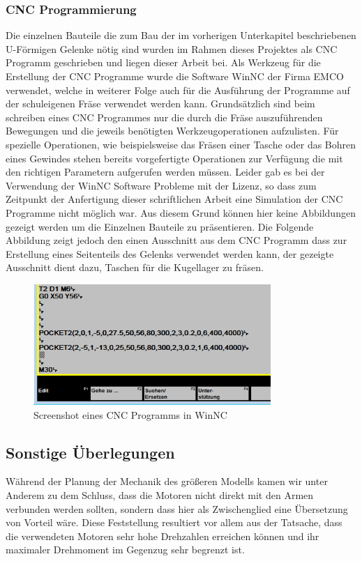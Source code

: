 \subsubsection{CNC Programmierung}
Die einzelnen Bauteile die zum Bau der im vorherigen Unterkapitel beschriebenen U-Förmigen Gelenke nötig sind wurden im Rahmen dieses Projektes als CNC Programm geschrieben und liegen dieser Arbeit bei. Als Werkzeug für die Erstellung der CNC Programme wurde die Software WinNC der Firma EMCO verwendet, welche in weiterer Folge auch für die Ausführung der Programme auf der schuleigenen Fräse verwendet werden kann. 
Grundsätzlich sind beim schreiben eines CNC Programmes nur die durch die Fräse auszuführenden Bewegungen und die jeweils benötigten Werkzeugoperationen aufzulisten. Für spezielle Operationen, wie beispielsweise das Fräsen einer Tasche oder das Bohren eines Gewindes stehen bereits vorgefertigte Operationen zur Verfügung die mit den richtigen Parametern aufgerufen werden müssen.
Leider gab es bei der Verwendung der WinNC Software Probleme mit der Lizenz, so dass zum Zeitpunkt der Anfertigung dieser schriftlichen Arbeit eine Simulation der CNC Programme nicht möglich war. Aus diesem Grund können hier keine Abbildungen gezeigt werden um die Einzelnen Bauteile zu präsentieren. Die Folgende Abbildung zeigt jedoch den einen Ausschnitt aus dem CNC Programm dass zur Erstellung eines Seitenteils des Gelenks verwendet werden kann, der gezeigte Ausschnitt dient dazu, Taschen für die Kugellager zu fräsen.

\begin{figure}[H]
\centering
\includegraphics[width=9cm]{images/cncprogramm}
\caption{Screenshot eines CNC Programms in WinNC}
\end{figure}

\subsection{Sonstige Überlegungen}
Während der Planung der Mechanik des größeren Modells kamen wir unter Anderem zu dem Schluss, dass die Motoren nicht direkt mit den Armen verbunden werden sollten, sondern dass hier als Zwischenglied eine Übersetzung von Vorteil wäre. Diese Feststellung resultiert vor allem aus der Tatsache, dass die verwendeten Motoren sehr hohe Drehzahlen erreichen können und ihr maximaler Drehmoment im Gegenzug sehr begrenzt ist.
